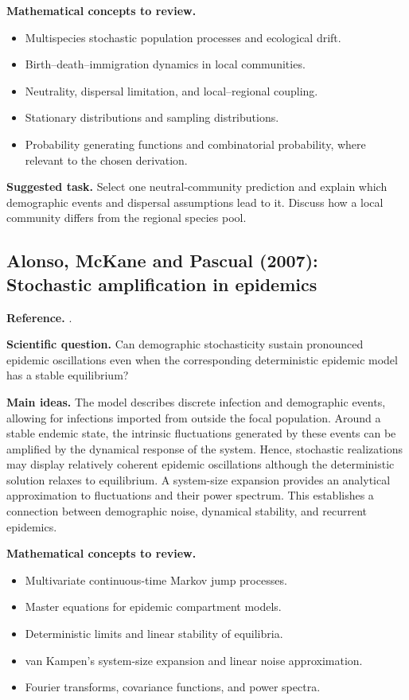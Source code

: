 \medskip\noindent\textbf{Mathematical concepts to review.}
\begin{itemize}
  \item Multispecies stochastic population processes and ecological drift.
  \item Birth--death--immigration dynamics in local communities.
  \item Neutrality, dispersal limitation, and local--regional coupling.
  \item Stationary distributions and sampling distributions.
  \item Probability generating functions and combinatorial probability,
        where relevant to the chosen derivation.
\end{itemize}

\noindent\textbf{Suggested task.} Select one neutral-community prediction
and explain which demographic events and dispersal assumptions lead to it.
Discuss how a local community differs from the regional species pool.

\subsection{Alonso, McKane and Pascual (2007): Stochastic amplification in epidemics}
\label{subsec:epidemics}
\noindent\textbf{Reference.} \citet{AlonsoMcKanePascual2007Epidemics}.

\medskip\noindent\textbf{Scientific question.}
Can demographic stochasticity sustain pronounced epidemic oscillations even
when the corresponding deterministic epidemic model has a stable equilibrium?

\medskip\noindent\textbf{Main ideas.}
The model describes discrete infection and demographic events, allowing for
infections imported from outside the focal population. Around a stable
endemic state, the intrinsic fluctuations generated by these events can be
amplified by the dynamical response of the system. Hence, stochastic
realizations may display relatively coherent epidemic oscillations although
the deterministic solution relaxes to equilibrium. A system-size expansion
provides an analytical approximation to fluctuations and their power spectrum.
This establishes a connection between demographic noise, dynamical
stability, and recurrent epidemics.

\medskip\noindent\textbf{Mathematical concepts to review.}
\begin{itemize}
  \item Multivariate continuous-time Markov jump processes.
  \item Master equations for epidemic compartment models.
  \item Deterministic limits and linear stability of equilibria.
  \item van Kampen's system-size expansion and linear noise approximation.
  \item Fourier transforms, covariance functions, and power spectra.
\end{itemize}

